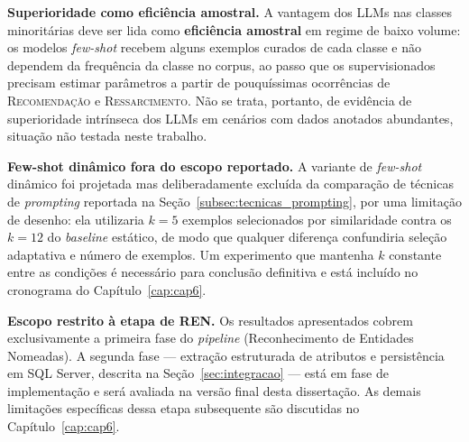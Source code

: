 \textbf{Superioridade como eficiência amostral.} A vantagem dos LLMs nas classes minoritárias deve ser lida como \textbf{eficiência amostral} em regime de baixo volume: os modelos \textit{few-shot} recebem alguns exemplos curados de cada classe e não dependem da frequência da classe no corpus, ao passo que os supervisionados precisam estimar parâmetros a partir de pouquíssimas ocorrências de \textsc{Recomendação} e \textsc{Ressarcimento}. Não se trata, portanto, de evidência de superioridade intrínseca dos LLMs em cenários com dados anotados abundantes, situação não testada neste trabalho.

\textbf{Few-shot dinâmico fora do escopo reportado.} A variante de \textit{few-shot} dinâmico foi projetada mas deliberadamente excluída da comparação de técnicas de \textit{prompting} reportada na Seção~\ref{subsec:tecnicas_prompting}, por uma limitação de desenho: ela utilizaria $k = 5$ exemplos selecionados por similaridade contra os $k = 12$ do \textit{baseline} estático, de modo que qualquer diferença confundiria seleção adaptativa e número de exemplos. Um experimento que mantenha $k$ constante entre as condições é necessário para conclusão definitiva e está incluído no cronograma do Capítulo~\ref{cap:cap6}.

\textbf{Escopo restrito à etapa de REN.} Os resultados apresentados cobrem exclusivamente a primeira fase do \textit{pipeline} (Reconhecimento de Entidades Nomeadas). A segunda fase --- extração estruturada de atributos e persistência em SQL Server, descrita na Seção~\ref{sec:integracao} --- está em fase de implementação e será avaliada na versão final desta dissertação. As demais limitações específicas dessa etapa subsequente são discutidas no Capítulo~\ref{cap:cap6}.